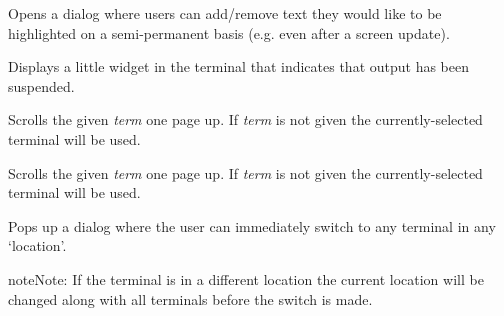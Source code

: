 \documentclass[letterpaper,10pt,openany]{sphinxmanual}
\begin{document}
\begin{fulllineitems}
\label{Applications/terminal/js_terminal:GateOne.Terminal.highlightDialog}
Opens a dialog where users can add/remove text they would like to be highlighted on a semi-permanent basis (e.g. even after a screen update).

\end{fulllineitems}


\begin{fulllineitems}
\label{Applications/terminal/js_terminal:GateOne.Terminal.showSuspended}
Displays a little widget in the terminal that indicates that output has been suspended.

\end{fulllineitems}


\begin{fulllineitems}
\label{Applications/terminal/js_terminal:GateOne.Terminal.scrollPageUp}
Scrolls the given \emph{term} one page up.  If \emph{term} is not given the currently-selected terminal will be used.

\end{fulllineitems}


\begin{fulllineitems}
\label{Applications/terminal/js_terminal:GateOne.Terminal.scrollPageDown}
Scrolls the given \emph{term} one page up.  If \emph{term} is not given the currently-selected terminal will be used.

\end{fulllineitems}


\begin{fulllineitems}
\label{Applications/terminal/js_terminal:GateOne.Terminal.chooser}
Pops up a dialog where the user can immediately switch to any terminal in any `location'.

\begin{notice}{note}{Note:}
If the terminal is in a different location the current location will be changed along with all terminals before the switch is made.
\end{notice}

\end{fulllineitems}
\end{document}

